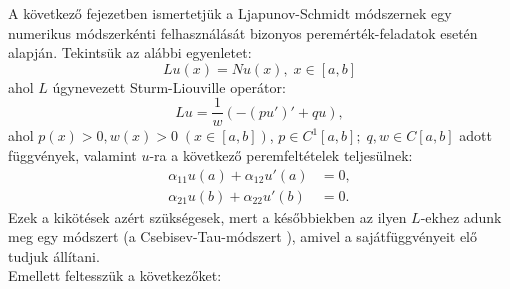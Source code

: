 \documentclass[oneside, titlepage, 12pt, a4paper]{report}
\begin{document}
A következő fejezetben ismertetjük a Ljapunov-Schmidt módszernek egy numerikus módszerkénti felhasználását bizonyos peremérték-feladatok esetén \cite{LSNum} alapján. %
Tekintsük az alábbi egyenletet:
\begin{equation}
Lu(x) = Nu(x),\;x\in[a, b] \label{eq:num:1}
\end{equation}
ahol $L$ úgynevezett Sturm-Liouville operátor:
\begin{equation*}
L u = \frac{1}{w} ( -(p u')' + q u),
\end{equation*}
ahol $p(x) > 0, w(x) > 0\;(x \in [a, b])$, $p \in C^1[a, b];\;q, w \in C[a, b]$ adott függvények, valamint $u$-ra a következő peremfeltételek teljesülnek:
\begin{align*}
\alpha_{11}u(a) + \alpha_{12}u'(a) &= 0, \\
\alpha_{21}u(b) + \alpha_{22}u'(b) &= 0.
\end{align*}
Ezek a kikötések azért szükségesek, mert a későbbiekben az ilyen $L$-ekhez adunk meg egy módszert (a Csebisev-Tau-módszert \cite{ChebysevTau}), amivel a sajátfüggvényeit elő tudjuk állítani. \\ %
Emellett feltesszük a következőket:
\end{document}
